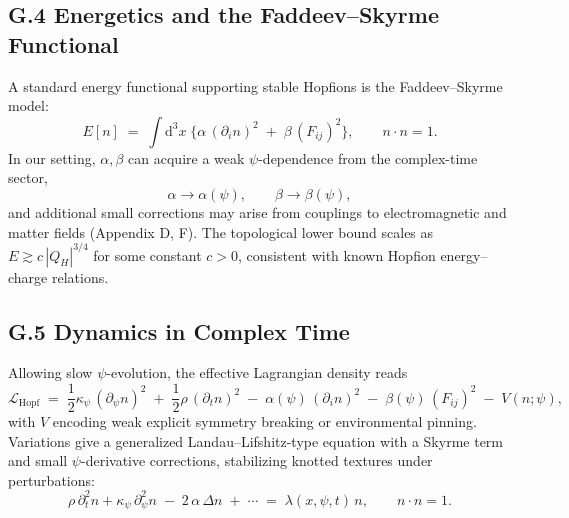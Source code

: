 \documentclass[12pt,a4paper]{article}
\begin{document}
\subsection*{G.4 Energetics and the Faddeev--Skyrme Functional}
A standard energy functional supporting stable Hopfions is the Faddeev--Skyrme model:
\begin{equation}
E[n] \;=\; \int\! \mathrm{d}^3x \;\Big\{ \alpha\, (\partial_i n)^2 \;+\; \beta\, (F_{ij})^2 \Big\},\qquad n\cdot n=1.
\end{equation}
In our setting, $\alpha,\beta$ can acquire a weak $\psi$-dependence from the complex-time sector,
\begin{equation}
\alpha \to \alpha(\psi),\qquad \beta \to \beta(\psi),
\end{equation}
and additional small corrections may arise from couplings to electromagnetic and matter fields (Appendix D, F). 
The topological lower bound scales as $E \gtrsim c\, |Q_H|^{3/4}$ for some constant $c>0$, consistent with known Hopfion energy--charge relations.

\subsection*{G.5 Dynamics in Complex Time}
Allowing slow $\psi$-evolution, the effective Lagrangian density reads
\begin{equation}
\mathcal{L}_{\mathrm{Hopf}} \;=\; \frac{1}{2} \kappa_\psi \, (\partial_\psi n)^2 \;+\; \frac{1}{2}\rho \, (\partial_t n)^2 \;-\; \alpha(\psi)\, (\partial_i n)^2 \;-\; \beta(\psi)\, (F_{ij})^2 \;-\; V(n;\psi),
\end{equation}
with $V$ encoding weak explicit symmetry breaking or environmental pinning. 
Variations give a generalized Landau--Lifshitz-type equation with a Skyrme term and small $\psi$-derivative corrections, stabilizing knotted textures under perturbations:
\begin{equation}
\rho\, \partial_t^2 n + \kappa_\psi\, \partial_\psi^2 n \;-\; 2\,\alpha \,\Delta n \;+\; \cdots \;=\; \lambda(x,\psi,t)\, n,\qquad n\cdot n=1.
\end{equation}
\end{document}
